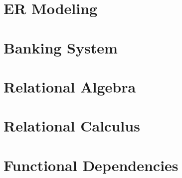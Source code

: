 \section{ER Modeling}

\section{Banking System}

\section{Relational Algebra}

\section{Relational Calculus}

\section{Functional Dependencies}
